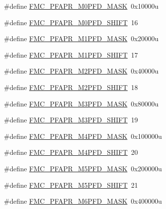 \begin{DoxyCompactItemize}
\item 
\#define \hyperlink{group___f_m_c___register___masks_ga5f6efa8c02f2a2f04d5b62f8de35e9a9}{F\+M\+C\+\_\+\+P\+F\+A\+P\+R\+\_\+\+M0\+P\+F\+D\+\_\+\+M\+A\+SK}~0x10000u
\item 
\#define \hyperlink{group___f_m_c___register___masks_ga5d7609bb54910d8b7be4dc3b868c040c}{F\+M\+C\+\_\+\+P\+F\+A\+P\+R\+\_\+\+M0\+P\+F\+D\+\_\+\+S\+H\+I\+FT}~16
\item 
\#define \hyperlink{group___f_m_c___register___masks_ga3288aee0551874c34ce18211489a5f74}{F\+M\+C\+\_\+\+P\+F\+A\+P\+R\+\_\+\+M1\+P\+F\+D\+\_\+\+M\+A\+SK}~0x20000u
\item 
\#define \hyperlink{group___f_m_c___register___masks_gaf51c3aa2255cc9c8efe5c2a705593f8f}{F\+M\+C\+\_\+\+P\+F\+A\+P\+R\+\_\+\+M1\+P\+F\+D\+\_\+\+S\+H\+I\+FT}~17
\item 
\#define \hyperlink{group___f_m_c___register___masks_ga25320b4377f5b7137bece86c278122a4}{F\+M\+C\+\_\+\+P\+F\+A\+P\+R\+\_\+\+M2\+P\+F\+D\+\_\+\+M\+A\+SK}~0x40000u
\item 
\#define \hyperlink{group___f_m_c___register___masks_ga52792f2b60fa3fef0d38b172867adfe9}{F\+M\+C\+\_\+\+P\+F\+A\+P\+R\+\_\+\+M2\+P\+F\+D\+\_\+\+S\+H\+I\+FT}~18
\item 
\#define \hyperlink{group___f_m_c___register___masks_ga7ec6298e08ea7c43a5233d895ebb3c06}{F\+M\+C\+\_\+\+P\+F\+A\+P\+R\+\_\+\+M3\+P\+F\+D\+\_\+\+M\+A\+SK}~0x80000u
\item 
\#define \hyperlink{group___f_m_c___register___masks_ga0de5ac6c72c9bc67057f028f4a946539}{F\+M\+C\+\_\+\+P\+F\+A\+P\+R\+\_\+\+M3\+P\+F\+D\+\_\+\+S\+H\+I\+FT}~19
\item 
\#define \hyperlink{group___f_m_c___register___masks_gaa1b82d16461f952ac2b92896f79059a3}{F\+M\+C\+\_\+\+P\+F\+A\+P\+R\+\_\+\+M4\+P\+F\+D\+\_\+\+M\+A\+SK}~0x100000u
\item 
\#define \hyperlink{group___f_m_c___register___masks_gaf06886cc4a8e2d455cef47f111ac8a4b}{F\+M\+C\+\_\+\+P\+F\+A\+P\+R\+\_\+\+M4\+P\+F\+D\+\_\+\+S\+H\+I\+FT}~20
\item 
\#define \hyperlink{group___f_m_c___register___masks_ga4ac647b6c05fcd080c70febe293bd169}{F\+M\+C\+\_\+\+P\+F\+A\+P\+R\+\_\+\+M5\+P\+F\+D\+\_\+\+M\+A\+SK}~0x200000u
\item 
\#define \hyperlink{group___f_m_c___register___masks_ga1efe3150392c8b3b9e4f42ec43bfef39}{F\+M\+C\+\_\+\+P\+F\+A\+P\+R\+\_\+\+M5\+P\+F\+D\+\_\+\+S\+H\+I\+FT}~21
\item 
\#define \hyperlink{group___f_m_c___register___masks_ga6d5a68ef8363082c0c7077c380e7aad6}{F\+M\+C\+\_\+\+P\+F\+A\+P\+R\+\_\+\+M6\+P\+F\+D\+\_\+\+M\+A\+SK}~0x400000u

\end{DoxyCompactItemize}
